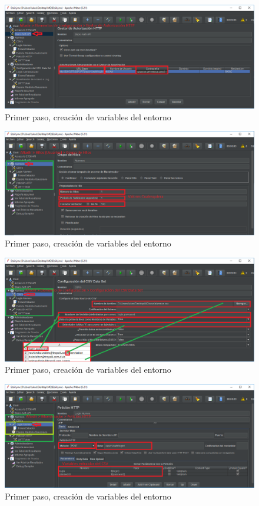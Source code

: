 \documentclass[12pt,a4paper]{article}
\begin{document}
	\begin{figure}[h]
		\centering
		\includegraphics[width=1.0\textwidth]{images/step-3.png}
		\caption{Primer paso, creación de variables del entorno}
	\end{figure}

	\begin{figure}[h]
		\centering
		\includegraphics[width=1.0\textwidth]{images/step-4.png}
		\caption{Primer paso, creación de variables del entorno}
	\end{figure}
	
	
	\begin{figure}[h]
		\centering
		\includegraphics[width=1.0\textwidth]{images/step-5.png}
		\caption{Primer paso, creación de variables del entorno}
	\end{figure}

	\begin{figure}[h]
		\centering
		\includegraphics[width=1.0\textwidth]{images/step-6.png}
		\caption{Primer paso, creación de variables del entorno}
	\end{figure}
\end{document}
